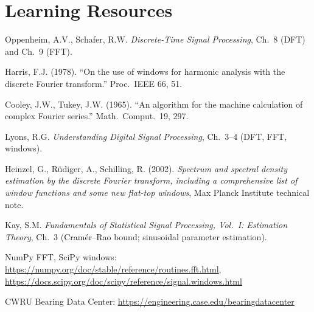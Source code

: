 \documentclass[11pt,a4paper]{article}
\begin{document}
\section*{Learning Resources}
\begin{resources}
  \item Oppenheim, A.V., Schafer, R.W. \emph{Discrete-Time Signal Processing}, Ch.~8 (DFT) and Ch.~9 (FFT).
  \item Harris, F.J. (1978). ``On the use of windows for harmonic analysis with the discrete Fourier transform.'' Proc.\ IEEE 66, 51.
  \item Cooley, J.W., Tukey, J.W. (1965). ``An algorithm for the machine calculation of complex Fourier series.'' Math.\ Comput.\ 19, 297.
\end{resources}
\begin{resources}
  \item Lyons, R.G. \emph{Understanding Digital Signal Processing}, Ch.~3--4 (DFT, FFT, windows).
  \item Heinzel, G., R\"udiger, A., Schilling, R. (2002). \emph{Spectrum and spectral density estimation by the discrete Fourier transform, including a comprehensive list of window functions and some new flat-top windows}, Max Planck Institute technical note.
  \item Kay, S.M. \emph{Fundamentals of Statistical Signal Processing, Vol.~I: Estimation Theory}, Ch.~3 (Cram\'er--Rao bound; sinusoidal parameter estimation).
\end{resources}
\begin{resources}
  \item NumPy FFT, SciPy windows: \url{https://numpy.org/doc/stable/reference/routines.fft.html}, \url{https://docs.scipy.org/doc/scipy/reference/signal.windows.html}
  \item CWRU Bearing Data Center: \url{https://engineering.case.edu/bearingdatacenter}
\end{resources}

\evaluation
\end{document}
